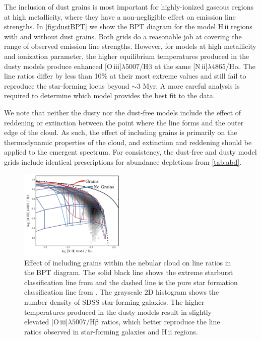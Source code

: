 \documentclass[twocolumn, tighten]{aastex61}
\newcommand{\Fig}[1]{\autoref{fig:#1}}
\newcommand{\Tab}[1]{\autoref{tab:#1}}
\newcommand{\nii}{[N\,{\sc ii}]\xspace}
\newcommand{\oiii}{[O\,{\sc iii}]\xspace}
\newcommand{\ha}{\ensuremath{\mathrm{H\alpha}}}
\newcommand{\hb}{\ensuremath{\mathrm{H\beta}}}
\newcommand{\hii}{H\,{\sc ii}\xspace}
\newcommand\lam[1]{\ensuremath{\lambda #1}}
\newcommand\niiha{\nii{}\lam{4865}/\ha{}}
\newcommand\oiiihb{\oiii{}\lam{5007}/\hb{}}
\begin{document}
The inclusion of dust grains is most important for highly-ionized gaseous regions at high metallicity, where they have a non-negligible effect on emission line strengths. In \Fig{dustBPT} we show the BPT diagram for the model \hii regions with and without dust grains. Both grids do a reasonable job at covering the range of observed emission line strengths. However, for models at high metallicity and ionization parameter, the higher equilibrium temperatures produced in the dusty models produce enhanced \oiiihb{} at the same \niiha{}. The line ratios differ by less than 10\% at their most extreme values and still fail to reproduce the star-forming locus beyond $\sim 3$ Myr. A more careful analysis is required to determine which model provides the best fit to the data.

We note that neither the dusty nor the dust-free models include the effect of reddening or extinction between the point where the line forms and the outer edge of the cloud. As such, the effect of including grains is primarily on the thermodynamic properties of the cloud, and extinction and reddening should be applied to the emergent spectrum. For consistency, the dust-free and dusty model grids include identical prescriptions for abundance depletions from \Tab{abd}.
\begin{figure}
  \begin{centering}
    \includegraphics[width=0.45\textwidth]{f29.pdf}
    \caption{Effect of including grains within the nebular cloud on line ratios in the BPT diagram. The solid black line shows the extreme starburst classification line from \citet{Kewley01} and the dashed line is the pure star formation classification line from \citet{Kauffmann03a}. The grayscale 2D histogram shows the number density of SDSS star-forming galaxies. The higher temperatures produced in the dusty models result in slightly elevated \oiiihb{} ratios, which better reproduce the line ratios observed in star-forming galaxies and \hii regions.}
    \label{fig:dustBPT}
  \end{centering}
\end{figure}
\end{document}
